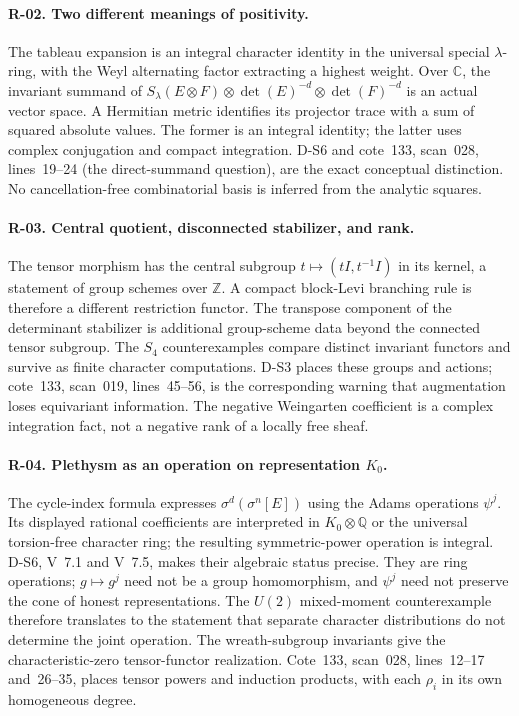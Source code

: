 \paragraph{R-02. Two different meanings of positivity.}
The tableau expansion is an integral character identity in the universal special $\lambda$-ring, with the Weyl alternating factor extracting a highest weight. Over $\mathbb C$, the invariant summand of $S_\lambda(E\otimes F)\otimes\det(E)^{-d}\otimes\det(F)^{-d}$ is an actual vector space. A Hermitian metric identifies its projector trace with a sum of squared absolute values. The former is an integral identity; the latter uses complex conjugation and compact integration. D-S6 and cote~133, scan~028, lines~19--24 (the direct-summand question), are the exact conceptual distinction. No cancellation-free combinatorial basis is inferred from the analytic squares.

\paragraph{R-03. Central quotient, disconnected stabilizer, and rank.}
The tensor morphism has the central subgroup $t\mapsto(tI,t^{-1}I)$ in its kernel, a statement of group schemes over $\mathbb Z$. A compact block-Levi branching rule is therefore a different restriction functor. The transpose component of the determinant stabilizer is additional group-scheme data beyond the connected tensor subgroup. The $S_4$ counterexamples compare distinct invariant functors and survive as finite character computations. D-S3 places these groups and actions; cote~133, scan~019, lines~45--56, is the corresponding warning that augmentation loses equivariant information. The negative Weingarten coefficient is a complex integration fact, not a negative rank of a locally free sheaf.

\paragraph{R-04. Plethysm as an operation on representation $K_0$.}
The cycle-index formula expresses $\sigma^d(\sigma^n[E])$ using the Adams operations $\psi^j$. Its displayed rational coefficients are interpreted in $K_0\otimes\mathbb Q$ or the universal torsion-free character ring; the resulting symmetric-power operation is integral. D-S6, V~7.1 and V~7.5, makes their algebraic status precise. They are ring operations; $g\mapsto g^j$ need not be a group homomorphism, and $\psi^j$ need not preserve the cone of honest representations. The $U(2)$ mixed-moment counterexample therefore translates to the statement that separate character distributions do not determine the joint operation. The wreath-subgroup invariants give the characteristic-zero tensor-functor realization. Cote~133, scan~028, lines~12--17 and~26--35, places tensor powers and induction products, with each $\rho_i$ in its own homogeneous degree.

